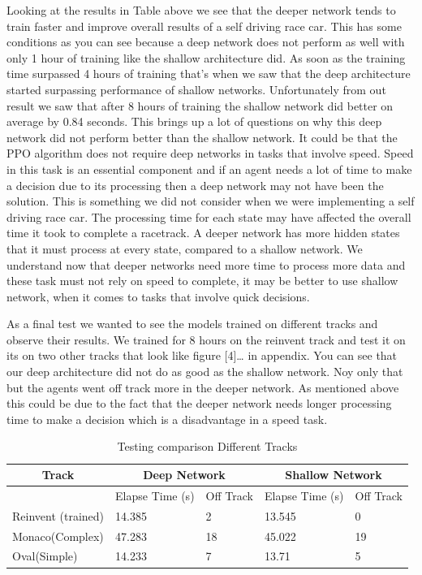 \documentclass[journal]{IEEEtran}
\begin{document}
Looking at the results in Table above we see that the deeper network tends to train faster and improve overall results of a self driving race car.  This has some conditions as you can see because a deep network does not perform as well with only 1 hour of training like the shallow architecture did.  As soon as the training time surpassed 4 hours of training that's when we saw that the deep architecture started surpassing performance of shallow networks.  Unfortunately from out result we saw that after 8 hours of training the shallow network did better on average by 0.84 seconds.  This brings up a lot of questions on why this deep network did not perform better than the shallow network.  It could be that the PPO algorithm does not require deep networks in tasks that involve speed.  Speed in this task is an essential component and if an agent needs a lot of time to make a decision due to its processing then a deep network may not have been the solution.  This is something we did not consider when we were implementing a self driving race car.  The processing time for each state may have affected the overall time it took to complete a racetrack.  A deeper network has more hidden states that it must process at every state, compared to a shallow network.  We understand now that deeper networks need more time to process more data and these task must not rely on speed to complete, it may be better to use shallow network, when it comes to tasks that involve quick decisions.

As a final test we wanted to see the models trained on different tracks and observe their results.  We trained for 8 hours on the reinvent track and test it on its on two other tracks that look like figure [4]… in appendix.  You can see that our deep architecture did not do as good as the shallow network.  Noy only that but the agents went off track more in the deeper network.  As mentioned above this could be due to the fact that the deeper network needs longer processing time to make a decision which is a disadvantage in a speed task.

\begin{table}[t]
\centering
\caption{Testing comparison Different Tracks}
\begin{tabular}{ |p{3cm}|p{1.5cm}|p{1cm}|p{1.5cm}|p{1cm}| }
\hline
 \multicolumn{1}{|c|}{Track} & \multicolumn{2}{|c|}{Deep Network} & \multicolumn{2}{|c|}{Shallow Network} \\
\hline
 & Elapse Time (s) & Off Track &  Elapse Time (s) & Off Track  \\
\hline
\multirow{1}{8em}{Reinvent (trained)} & 14.385	 & 2 & 13.545	 & 0 \\ 
 \hline
\multirow{1}{8em}{Monaco(Complex)} & 47.283	 & 18 & 45.022	& 19 \\ 
 \hline
\multirow{1}{8em}{Oval(Simple)} & 14.233	 & 7 & 13.71 & 5 \\ 
 \hline
\end{tabular}
\label{DiffRacetrackTest}
\end{table}
\end{document}
